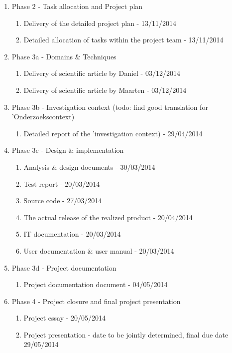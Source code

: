  \begin{enumerate}
	\item Phase 2 - Task allocation and Project plan
 	\begin{enumerate}
		\item Delivery of the detailed project plan 			- 	13/11/2014
		\item Detailed allocation of tasks within the project team 	- 	13/11/2014
	\end {enumerate}
	\item Phase 3a - Domains \& Techniques
 	\begin{enumerate}
		\item Delivery of scientific article by Daniel			- 	03/12/2014
		\item Delivery of scientific article by Maarten  			- 	03/12/2014
	\end {enumerate}
 	\item Phase 3b - Investigation context (todo: find good translation for 'Onderzoekscontext)
 	\begin{enumerate}
		\item Detailed report of the 'investigation context)  		- 	29/04/2014
	\end {enumerate}
 	\item Phase 3c - Design \& implementation
 	\begin{enumerate}
		\item Analysis \& design documents  				- 	30/03/2014
		\item Test report  							- 	20/03/2014
		\item Source code  							- 	27/03/2014
		\item The actual release of the realized product  		- 	20/04/2014
		\item IT documentation  						- 	20/03/2014
		\item User documentation \& user manual  			- 	20/03/2014
	\end {enumerate}
 	\item Phase 3d - Project documentation
 	\begin{enumerate}
		\item Project documentation document				- 	04/05/2014
	\end {enumerate}
	\item Phase 4 - Project closure and final project presentation
 	\begin{enumerate}
		\item Project essay							- 	20/05/2014
		\item Project presentation						- 	date to be jointly determined, final due date 29/05/2014
	\end {enumerate}
\end {enumerate}

